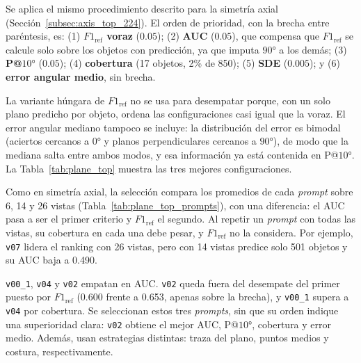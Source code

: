 Se aplica el mismo procedimiento descrito para la simetría axial (Sección~\ref{subsec:axis_top_224}). El orden de prioridad, con la brecha entre paréntesis, es: (1) \textbf{$F1_{\text{ref}}$ voraz} ($0.05$); (2) \textbf{AUC} ($0.05$), que compensa que $F1_{\text{ref}}$ se calcule solo sobre los objetos con predicción, ya que imputa $90°$ a los demás; (3) \textbf{P@$10°$} ($0.05$); (4) \textbf{cobertura} (17 objetos, 2\% de 850); (5) \textbf{SDE} ($0.005$); y (6) \textbf{error angular medio}, sin brecha.

La variante húngara de $F1_{\text{ref}}$ no se usa para desempatar porque, con un solo plano predicho por objeto, ordena las configuraciones casi igual que la voraz. El error angular mediano tampoco se incluye: la distribución del error es bimodal (aciertos cercanos a $0°$ y planos perpendiculares cercanos a $90°$), de modo que la mediana salta entre ambos modos, y esa información ya está contenida en P@$10°$. La Tabla~\ref{tab:plane_top} muestra las tres mejores configuraciones.



Como en simetría axial, la selección compara los promedios de cada \textit{prompt} sobre 6, 14 y 26 vistas (Tabla~\ref{tab:plane_top_prompts}), con una diferencia: el AUC pasa a ser el primer criterio y $F1_{\text{ref}}$ el segundo. Al repetir un \textit{prompt} con todas las vistas, su cobertura en cada una debe pesar, y $F1_{\text{ref}}$ no la considera. Por ejemplo, \texttt{v07} lidera el ranking con 26 vistas, pero con 14 vistas predice solo 501 objetos y su AUC baja a 0.490.



\texttt{v00\_1}, \texttt{v04} y \texttt{v02} empatan en AUC. \texttt{v02} queda fuera del desempate del primer puesto por $F1_{\text{ref}}$ (0.600 frente a 0.653, apenas sobre la brecha), y \texttt{v00\_1} supera a \texttt{v04} por cobertura. Se seleccionan estos tres \textit{prompts}, sin que su orden indique una superioridad clara: \texttt{v02} obtiene el mejor AUC, P@$10°$, cobertura y error medio. Además, usan estrategias distintas: traza del plano, puntos medios y costura, respectivamente.


